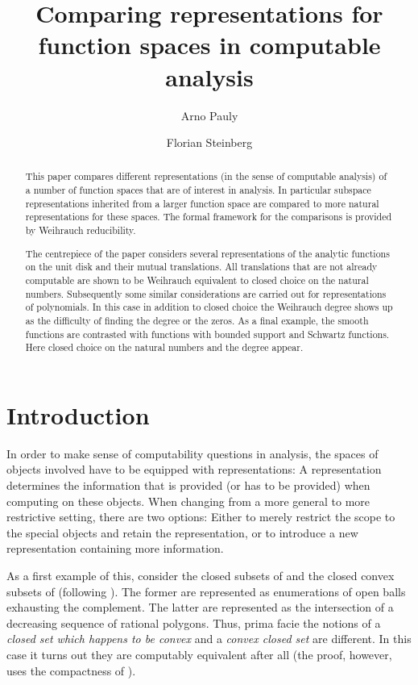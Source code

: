 \documentclass{eptcs-modified}
\title{Comparing representations for function spaces in computable analysis}
\author{
Arno Pauly
\institute{Computer Laboratory\\ University of Cambridge, United Kingdom \\ \& \\
D\'epartement d'Informatique\\ Universit\'e Libre de Bruxelles, Belgium
\email{Arno.Pauly@cl.cam.ac.uk}}
\and
Florian Steinberg
\institute{Fachbereich Mathematik\\ TU-Darmstadt, Germany
\email{steinberg@mathematik.tu-darmstadt.de}}
}
\begin{document}
 \theoremstyle{definition}

	\maketitle

	\begin{abstract}
		This paper compares different representations (in the sense of computable analysis) of a number of function spaces that are of interest in analysis.
		In particular subspace representations inherited from a larger function space are compared to more natural representations for these spaces.
		The formal framework for the comparisons is provided by Weihrauch reducibility.

		The centrepiece of the paper considers several representations of the analytic functions on the unit disk and their mutual translations.
		All translations that are not already computable are shown to be Weihrauch equivalent to closed choice on the natural numbers.
		Subsequently some similar considerations are carried out for representations of polynomials.
		In this case in addition to closed choice the Weihrauch degree  shows up as the difficulty of finding the degree or the zeros.
		As a final example, the smooth functions are contrasted with functions with bounded support and Schwartz functions.
		Here closed choice on the natural numbers and the  degree appear.
\end{abstract}
	\tableofcontents

	\section{Introduction}
		In order to make sense of computability questions in analysis, the spaces of objects involved have to be equipped with representations:
		A representation determines the information that is provided (or has to be provided) when computing on these objects.
		When changing from a more general to more restrictive setting, there are two options:
		Either to merely restrict the scope to the special objects and retain the representation, or to introduce a new representation containing more information.

		As a first example of this, consider the closed subsets of  and the closed convex subsets of  (following \cite{paulyleroux}).
		The former are represented as enumerations of open balls exhausting the complement.
		The latter are represented as the intersection of a decreasing sequence of rational polygons.
		Thus, prima facie the notions of a \emph{closed set which happens to be convex} and a \emph{convex closed set} are different.
		In this case it turns out they are computably equivalent after all (the proof, however, uses the compactness of ).
\end{document}
